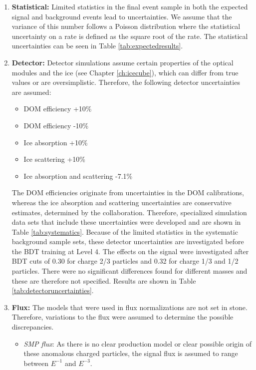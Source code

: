 \vspace{2mm}
\begin{enumerate}
\item \textbf{Statistical:} Limited statistics in the final event sample in both the expected signal and background events lead to uncertainties. We assume that the variance of this number follows a Poisson distribution where the statistical uncertainty on a rate is defined as the square root of the rate. The statistical uncertainties can be seen in Table \ref{tab:expectedresults}.
\item \textbf{Detector: } Detector simulations assume certain properties of the optical modules and the ice (see Chapter \ref{ch:icecube}), which can differ from true values or are oversimplistic. Therefore, the following detector uncertainties are assumed:
\vspace{2mm}
\begin{itemize}
\item DOM efficiency +10\%
\item DOM efficiency -10\%
\item Ice absorption +10\%
\item Ice scattering +10\%
\item Ice absorption and scattering -7.1\%
\end{itemize}
\vspace{2mm}
The DOM efficiencies originate from uncertainties in the DOM calibrations, whereas the ice absorption and scattering uncertainties are conservative estimates, determined by the collaboration. Therefore, specialized simulation data sets that include these uncertainties were developed and are shown in Table \ref{tab:systematics}. Because of the limited statistics in the systematic background sample sets, these detector uncertainties are investigated before the BDT training at Level 4. The effects on the signal were investigated after BDT cuts of 0.30 for charge 2/3 particles and 0.32 for charge 1/3 and 1/2 particles. There were no significant differences found for different masses and these are therefore not specified. Results are shown in Table \ref{tab:detectoruncertainties}.
\item \textbf{Flux: }The models that were used in flux normalizations are not set in stone. Therefore, variations to the flux were assumed to determine the possible discrepancies.
\begin{itemize}
\item \textit{SMP flux}: As there is no clear production model or clear possible origin of these anomalous charged particles, the signal flux is assumed to range between $E^{-1}$ and $E^{-3}$. 

\end{itemize}
\end{enumerate}
